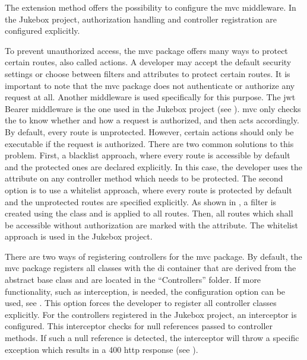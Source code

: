 
The  extension method offers the possibility to configure the \gls{mvc} middleware. In the Jukebox project, authorization handling and controller registration are configured explicitly.

To prevent unauthorized access, the \gls{mvc} package offers many ways to protect certain routes, also called actions. A developer may accept the default security settings or choose between filters and attributes to protect certain routes. It is important to note that the \gls{mvc} package does not authenticate or authorize any request at all. Another middleware is used specifically for this purpose. The \gls{jwt} Bearer middleware is the one used in the Jukebox project (see ). \gls{mvc} only checks the  to know whether and how a request is authorized, and then acts accordingly. By default, every route is unprotected. However, certain actions should only be executable if the request is authorized. There are two common solutions to this problem. First, a blacklist approach, where every route is accessible by default and the protected ones are declared explicitly. In this case, the developer uses the \lstcode{[Authorize]} attribute on any controller method which needs to be protected. The second option is to use a whitelist approach, where every route is protected by default and the unprotected routes are specified explicitly. As shown in , a filter is created using the  class and is applied to all routes. Then, all routes which shall be accessible without authorization are marked with the \lstcode{[AllowAnonymous]} attribute. The whitelist approach is used in the Jukebox project.

There are two ways of registering controllers for the \gls{mvc} package. By default, the \gls{mvc} package registers all classes with the \gls{di} container that are derived from the abstract  base class and are located in the \enquote{Controllers} folder. If more functionality, such as interception, is needed, the  configuration option can be used, see . This option forces the developer to register all controller classes explicitly. For the controllers registered in the Jukebox project, an interceptor is configured. This interceptor checks for null references passed to controller methods. If such a null reference is detected, the interceptor will throw a specific exception which results in a 400 \gls{http} response (see ).

